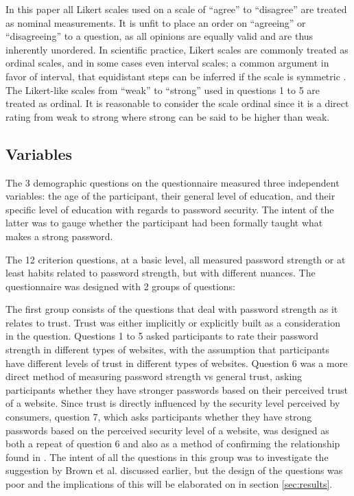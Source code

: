 \documentclass[letterpaper, 10 pt, conference]{ieeeconf}  %
\begin{document}
In this paper all Likert scales used on a scale of “agree” to “disagree” are treated as nominal measurements. It is unfit to place an order on “agreeing” or “disagreeing” to a question, as all opinions are equally valid and are thus inherently unordered. In scientific practice, Likert scales are commonly treated as ordinal scales, and in some cases even interval scales; a common argument in favor of interval, that equidistant steps can be inferred if the scale is symmetric \cite{Norman2010}. The Likert-like scales from “weak” to “strong” used in questions 1 to 5 are treated as ordinal. It is reasonable to consider the scale ordinal since it is a direct rating from weak to strong where strong can be said to be higher than weak.

\subsection{Variables}

The 3 demographic questions on the questionnaire measured three independent variables: the age of the participant, their general level of education, and their specific level of education with regards to password security. The intent of the latter was to gauge whether the participant had been formally taught what makes a strong password. 

The 12 criterion questions, at a basic level, all measured password strength or at least habits related to password strength, but with different nuances. The questionnaire was designed with 2 groups of questions:

The first group consists of the questions that deal with password strength as it relates to trust. Trust was either implicitly or explicitly built as a consideration in the question. Questions 1 to 5 asked participants to rate their password strength in different types of websites, with the assumption that participants have different levels of trust in different types of websites. Question 6 was a more direct method of measuring password strength vs general trust, asking participants whether they have stronger passwords based on their perceived trust of a website. Since trust is directly influenced by the security level perceived by consumers, question 7, which asks participants whether they have strong passwords based on the perceived security level of a website, was designed as both a repeat of question 6 and also as a method of confirming the relationship found in \cite{Flavian2006}. The intent of all the questions in this group was to investigate the suggestion by Brown et al. \cite{Brown2004} discussed earlier, but the design of the questions was poor and the implications of this will be elaborated on in section \ref{sec:results}.
\end{document}
